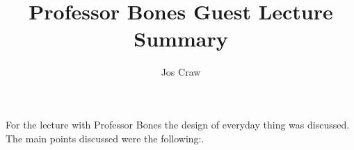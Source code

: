 \documentclass{article}
\title{Professor Bones Guest Lecture Summary}
\author{Jos Craw}
\begin{document}
\maketitle{}
For the lecture with Professor Bones the design of everyday thing was discussed. The main points
discussed were the following:.
\end{document}
